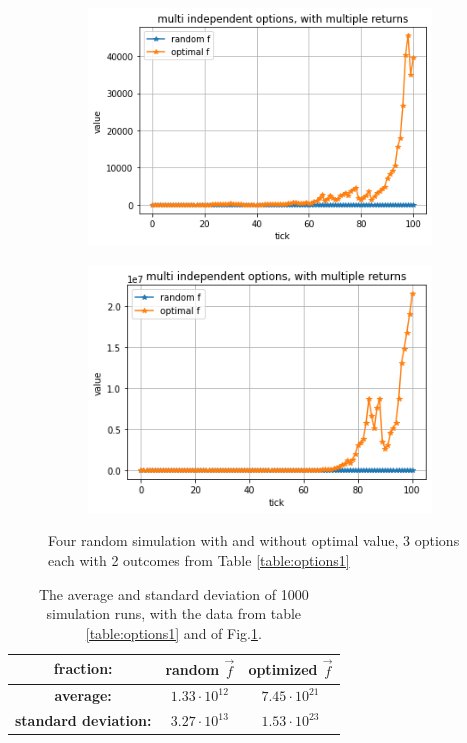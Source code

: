 \documentclass{article}
\begin{document}
\begin{figure}[!h]
		\begin{subfigure}{0.525\textwidth}
			\includegraphics[width=0.9\linewidth]{multi3}
		\end{subfigure}
		\begin{subfigure}{0.525\textwidth}
			\includegraphics[width=0.9\linewidth]{multi4}
		\end{subfigure}
		\caption{Four random simulation with and without optimal value, 3 options each with 2 outcomes from Table \ref{table:options1}}
		\label{Fig:multi1}
	\end{figure}
	
		
	\begin{table}[!h]
		\centering\begin{tabular}{|c||c|c|}
			\hline
			\textbf{fraction:} & random $\overrightarrow{f}$ & optimized $\overrightarrow{f}$ \\ 
			\hline\hline
			\textbf{average:}  & $1.33\cdot 10^{12}$ & $7.45\cdot 10^{21}$ \\
			\hline
			\textbf{standard deviation:}  & $3.27\cdot 10^{13}$ & $1.53\cdot 10^{23}$ \\
			\hline
		\end{tabular}
		\caption{The average and standard deviation of 1000 simulation runs, with the data from table \ref{table:options1} and of Fig.\ref{Fig:multi1}.}
		\label{multi:results1}
	\end{table}
\end{document}
